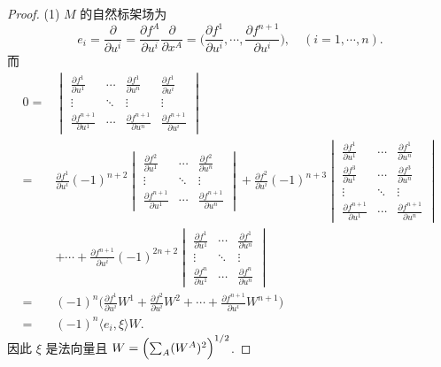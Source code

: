 \begin{proof}
  (1) $M$ 的自然标架场为
  \[e_i=\frac{\partial}{\partial u^i}=\frac{\partial f^A}{\partial u^i}\frac{\partial}{\partial x^A}
    =\biggl(\frac{\partial f^1}{\partial u^i},\cdots,\frac{\partial f^{n+1}}{\partial u^i}\biggr),
    \quad (i=1,\cdots,n).\]
  而
  \begin{align*}
    0
    ={} & \begin{vmatrix}
      \frac{\partial f^1}{\partial u^1} & \cdots & \frac{\partial f^1}{\partial u^n} & \frac{\partial f^1}{\partial u^i} \\
      \vdots & \ddots & \vdots & \vdots \\
      \frac{\partial f^{n+1}}{\partial u^1} & \cdots & \frac{\partial f^{n+1}}{\partial u^n} & \frac{\partial f^{n+1}}{\partial u^i}
    \end{vmatrix} \\
    ={} & \frac{\partial f^1}{\partial u^i}(-1)^{n+2}
      \begin{vmatrix}
        \frac{\partial f^2}{\partial u^1} & \cdots & \frac{\partial f^2}{\partial u^n} \\
        \vdots & \ddots & \vdots \\
        \frac{\partial f^{n+1}}{\partial u^1} & \cdots & \frac{\partial f^{n+1}}{\partial u^n}
      \end{vmatrix}
      +
      \frac{\partial f^2}{\partial u^i}(-1)^{n+3}
      \begin{vmatrix}
        \frac{\partial f^1}{\partial u^1} & \cdots & \frac{\partial f^1}{\partial u^n} \\
        \frac{\partial f^3}{\partial u^1} & \cdots & \frac{\partial f^3}{\partial u^n} \\
        \vdots & \ddots & \vdots \\
        \frac{\partial f^{n+1}}{\partial u^1} & \cdots & \frac{\partial f^{n+1}}{\partial u^n}
      \end{vmatrix} \\
    & + \cdots +
      \frac{\partial f^{n+1}}{\partial u^i}(-1)^{2n+2}
      \begin{vmatrix}
        \frac{\partial f^1}{\partial u^1} & \cdots & \frac{\partial f^1}{\partial u^n} \\
        \vdots & \ddots & \vdots \\
        \frac{\partial f^n}{\partial u^1} & \cdots & \frac{\partial f^n}{\partial u^n}
      \end{vmatrix} \\
    ={} & (-1)^n \biggl(\frac{\partial f^1}{\partial u^i} W^1 + 
      \frac{\partial f^2}{\partial u^i} W^2 + \cdots +
      \frac{\partial f^{n+1}}{\partial u^i} W^{n+1}\biggr) \\
    ={} & (-1)^n \langle e_i,\xi\rangle W.
  \end{align*}
  因此 $\xi$ 是法向量且 $W=\Bigl(\sum_A (W^A)^2\Bigr)^{1/2}$.


\end{proof}
